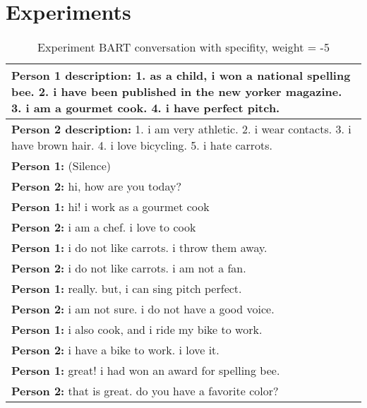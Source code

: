 \chapter{Experiments} \label{experiments}

\begin{table}[H]
\centering
 \begin{tabular}{|p{14cm}|} 
 \hline
 \textbf{Person 1 description:} 1. as a child, i won a national spelling bee. 2. i have been published in the new yorker magazine. 3. i am a gourmet cook. 4. i have perfect pitch. \\
 \hline
 \textbf{Person 2 description:} 1. i am very athletic. 2. i wear contacts. 3. i have brown hair. 4. i love bicycling. 5. i hate carrots. \\
 \hline
 \textbf{Person 1:} (Silence) \\
 \textbf{Person 2:} hi, how are you today? \\ 
 \textbf{Person 1:} hi! i work as a gourmet cook \\
 \textbf{Person 2:} i am a chef. i love to cook \\
 \textbf{Person 1:} i do not like carrots. i throw them away. \\
 \textbf{Person 2:} i do not like carrots. i am not a fan. \\
 \textbf{Person 1:} really. but, i can sing pitch perfect. \\
 \textbf{Person 2:} i am not sure. i do not have a good voice. \\
 \textbf{Person 1:} i also cook, and i ride my bike to work. \\
 \textbf{Person 2:} i have a bike to work. i love it. \\
 \textbf{Person 1:} great! i had won an award for spelling bee. \\
 \textbf{Person 2:} that is great. do you have a favorite color? \\
 \hline
 \end{tabular}
 \caption{Experiment BART conversation with specifity, weight = -5}
\label{tab:bart_conversation_idf-5_ap}
\end{table}


